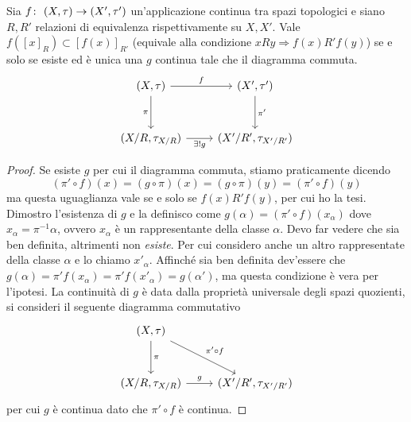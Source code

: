 \begin{lemma}
	\label{lem_qdom}
	Sia $f \colon\ (X, \tau) \rightarrow (X', \tau')$ un'applicazione continua tra spazi topologici e siano $R, R'$ relazioni di equivalenza rispettivamente su $X, X'$. Vale $f(\left[x\right]_R) \subset \left[f(x)\right]_{R'}$ (equivale alla condizione $xRy \Rightarrow f(x)R'f(y)$) se e solo se esiste ed è unica una $g$ continua tale che il diagramma commuta.
	\begin{equation*}
	\begin{tikzcd}[row sep = 3em]
		(X, \tau) \arrow[swap]{d}{\pi} \arrow{r}{f} & (X', \tau') \arrow{d}{\pi'}\\
		(X/R, \tau_{X/R}) \arrow[swap]{r}{\exists! g} & (X'/R', \tau_{X'/R'})
	\end{tikzcd}
	\end{equation*} 	
	
\end{lemma}
\begin{proof}
	Se esiste $g$ per cui il diagramma commuta, stiamo praticamente dicendo 
	\begin{equation*}
		(\pi' \circ f)(x) = (g \circ \pi)(x) = (g \circ \pi)(y) = (\pi' \circ f)(y)
	\end{equation*}
	ma questa uguaglianza vale se e solo se $f(x) R' f(y)$, per cui ho la tesi.\\
	
	Dimostro l'esistenza di $g$ e la definisco come $g(\alpha) = (\pi' \circ f)(x_\alpha)$ dove $x_\alpha = \pi^{-1}\alpha$, ovvero $x_\alpha$ è un rappresentante della classe $\alpha$. Devo far vedere che sia ben definita, altrimenti non \textit{esiste}.
	Per cui considero anche un altro rappresentate della classe $\alpha$ e lo chiamo $x'_\alpha$. Affinché sia ben definita dev'essere che $g(\alpha) = \pi'f(x_\alpha) = \pi' f(x'_\alpha) = g(\alpha')$, ma questa condizione è vera per l'ipotesi. La continuità di $g$ è data dalla proprietà universale degli spazi quozienti, si consideri il seguente diagramma commutativo
	\begin{equation*}
		\begin{tikzcd}[row sep = 3em]
			(X,\tau) \arrow{d}{\pi} \arrow{rd}{\pi' \circ f} & \\
			(X/R, \tau_{X/R}) \arrow{r}{g} & (X'/R', \tau_{X'/R'})
		\end{tikzcd}
	\end{equation*}
	per cui $g$ è continua dato che $\pi' \circ f$ è continua.
\end{proof}


